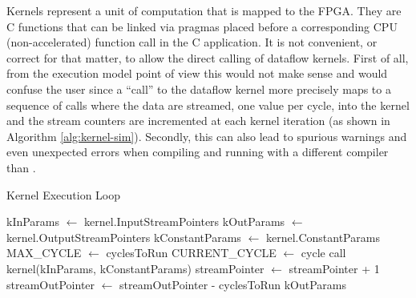 \label{sec:kernels-streams}

Kernels represent a unit of computation that is mapped to the FPGA.
They are C functions that can be linked via pragmas placed before a
corresponding CPU (non-accelerated) function call in the C
application.  It is not convenient, or correct for that matter, to
allow the direct calling of dataflow kernels. First of all, from the
execution model point of view this would not make sense and would
confuse the user since a ``call'' to the dataflow kernel more
precisely maps to a sequence of calls where the data are streamed, one
value per cycle, into the kernel and the stream counters are
incremented at each kernel iteration (as shown in Algorithm
\ref{alg:kernel-sim}).  Secondly, this can also lead to spurious
warnings and even unexpected errors when compiling and running with a
different compiler than \fastc{}.

\begin{algorithm}
  \caption{Kernel Execution Loop}
  \label{alg:kernel-sim}
  \begin{algorithmic}
    \State kInParams $\gets$ kernel.InputStreamPointers
    \State kOutParams $\gets$ kernel.OutputStreamPointers
    \State kConstantParams $\gets$ kernel.ConstantParams
    \State MAX\_CYCLE $\gets$ cyclesToRun
    \State CURRENT\_CYCLE $\gets$ cycle
    \State call kernel(kInParams, kConstantParams)
    \State streamPointer $\gets$ streamPointer + 1
    \EndFor
    \EndFor
    \State streamOutPointer $\gets$ streamOutPointer - cyclesToRun
    \EndFor
    \State \Return kOutParams
    \EndFunction
  \end{algorithmic}
\end{algorithm}

